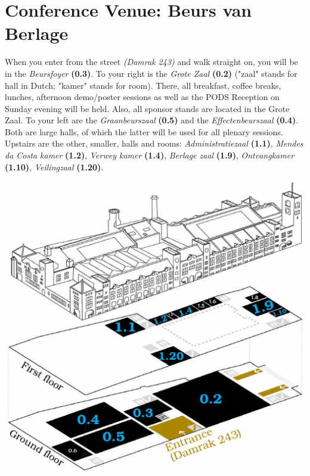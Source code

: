 
\section{Conference Venue: Beurs van Berlage}

When you enter from the street \emph{(Damrak 243)} and walk straight on, you will be in the \emph{Beursfoyer} \textbf{(0.3)}. To your right is the \emph{Grote Zaal} \textbf{(0.2)} ("zaal" stands for hall in Dutch; "kamer" stands for room). There, all breakfast, coffee breaks, lunches, afternoon demo/poster sessions as well as the PODS Reception on Sunday evening will be held. Also, all sponsor stands are located in the Grote Zaal. To your left are the \emph{Graanbeurszaal} \textbf{(0.5)} and the \emph{Effectenbeurszaal} \textbf{(0.4)}. Both are large halls, of which the latter will be used for all plenary sessions. Upstairs are the other, smaller, halls and rooms: \emph{Administratiezaal} \textbf{(1.1)}, \emph{Mendes da Costa kamer} \textbf{(1.2)}, \emph{Verwey kamer} \textbf{(1.4)}, \emph{Berlage zaal} \textbf{(1.9)}, \emph{Ontvangkamer} \textbf{(1.10)}, \emph{Veilingzaal} \textbf{(1.20)}.

 \includegraphics[width=\textwidth]{images/BvB-plan-3D-85mm-x-83mm.pdf}%

